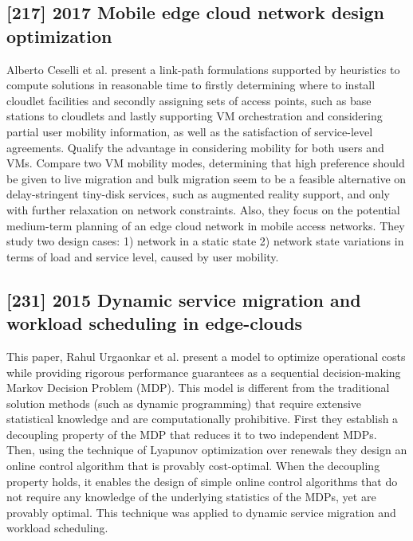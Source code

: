 \subsection{[217] 2017 Mobile edge cloud network design optimization}
\label{subsec:paper08}
Alberto Ceselli et al. \cite{ceselli2017mobile} present a link-path formulations supported by heuristics to compute solutions in reasonable time to firstly determining where to install cloudlet facilities and secondly assigning sets of access points, such as base stations to cloudlets and lastly supporting VM orchestration and considering partial user mobility information, as well as the satisfaction of service-level agreements. Qualify the advantage in considering mobility for both users and VMs. Compare two VM mobility modes, determining that high preference should be given to live migration and bulk migration seem to be a feasible alternative on delay-stringent tiny-disk services, such as augmented reality support, and only with further relaxation on network constraints. Also, they focus on the potential medium-term planning of an edge cloud network in mobile access networks. They study two design cases: 1) network in a static state 2) network state variations in terms of load and service level, caused by user mobility.

\subsection{[231] 2015 Dynamic service migration and workload scheduling in edge-clouds}
\label{subsec:paper09}
This paper, Rahul Urgaonkar et al. \cite{urgaonkar2015dynamic} present a model to optimize operational costs while providing rigorous performance guarantees as a sequential decision-making Markov Decision Problem (MDP). This model is different from the traditional solution methods (such as dynamic programming) that require extensive statistical knowledge and are computationally prohibitive. First they establish a decoupling property of the MDP that reduces it to two independent MDPs. Then, using the technique of Lyapunov optimization over renewals they design an online control algorithm that is provably cost-optimal. When the decoupling property holds, it enables the design of simple online control algorithms that do not require any knowledge of the underlying statistics of the MDPs, yet are provably optimal. This technique was applied to dynamic service migration and workload scheduling.

